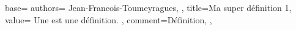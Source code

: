 {
  base={
    authors={
      Jean-Francois-Toumeyragues,
    },
    title=Ma super définition 1,
    value={
      Une  est une définition.
    },
    comment={Définition},
  },
}

